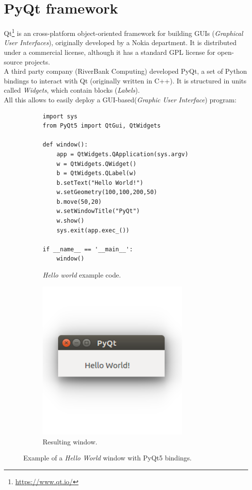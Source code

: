 \section{PyQt framework}
	Qt\footnote{\url{https://www.qt.io/}} is an cross-platform object-oriented framework for building GUIs (\emph{Graphical User Interfaces}), originally developed by a Nokia department. It is distributed under a commercial license, although it has a standard GPL license for open-source projects.\\
	
	A third party company (RiverBank Computing) developed PyQt, a set of Python bindings to interact with Qt (originally written in C++). It is structured in units called \emph{Widgets}, which contain blocks (\emph{Labels}).\\
	
	All this allows to easily deploy a GUI-based(\emph{Graphic User Interface}) program:
	\begin{figure}[h]
		\centering
		\begin{subfigure}[h]{0.55\linewidth}
			\centering
			\begin{lstlisting}
import sys
from PyQt5 import QtGui, QtWidgets

def window():
	app = QtWidgets.QApplication(sys.argv)
	w = QtWidgets.QWidget()
	b = QtWidgets.QLabel(w)
	b.setText("Hello World!")
	w.setGeometry(100,100,200,50)
	b.move(50,20)
	w.setWindowTitle("PyQt")
	w.show()
	sys.exit(app.exec_())

if __name__ == '__main__':
	window()
			\end{lstlisting}
			\caption{\emph{Hello world} example code.}
		\end{subfigure}
		\qquad
		\begin{subfigure}[h]{0.35\linewidth}
			\centering
			\includegraphics[width=3in]{images/pyqt_helloworld}
			\caption{Resulting window.}
		\end{subfigure}
		\caption{Example of a \emph{Hello World} window with PyQt5 bindings.}
		\label{fig:3_pyqt_helloworld}
	\end{figure}
	
